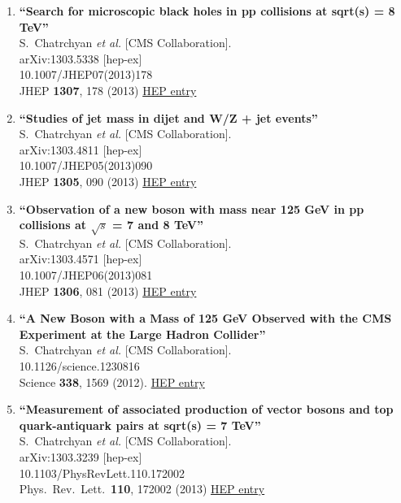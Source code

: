\documentclass{article}
\begin{document}
\begin{enumerate}
\item%
{\bf ``Search for microscopic black holes in pp collisions at sqrt(s) = 8 TeV''}
  \\{}S.~Chatrchyan {\it et al.} [CMS Collaboration].
  \\{}arXiv:1303.5338 [hep-ex]
    \\{}10.1007/JHEP07(2013)178
\\{}JHEP {\bf 1307}, 178 (2013) %
\href{http://inspirehep.net/record/1224805}{HEP entry}


\item%
{\bf ``Studies of jet mass in dijet and W/Z + jet events''}
  \\{}S.~Chatrchyan {\it et al.} [CMS Collaboration].
  \\{}arXiv:1303.4811 [hep-ex]
    \\{}10.1007/JHEP05(2013)090
\\{}JHEP {\bf 1305}, 090 (2013) %
\href{http://inspirehep.net/record/1224539}{HEP entry}


\item%
{\bf ``Observation of a new boson with mass near 125 GeV in pp collisions at $\sqrt{s}$ = 7 and 8 TeV''}
  \\{}S.~Chatrchyan {\it et al.} [CMS Collaboration].
  \\{}arXiv:1303.4571 [hep-ex]
    \\{}10.1007/JHEP06(2013)081
\\{}JHEP {\bf 1306}, 081 (2013) %
\href{http://inspirehep.net/record/1224273}{HEP entry}


\item%
{\bf ``A New Boson with a Mass of 125 GeV Observed with the CMS Experiment at the Large Hadron Collider''}
  \\{}S.~Chatrchyan {\it et al.} [CMS Collaboration].
    \\{}10.1126/science.1230816
\\{}Science {\bf 338}, 1569 (2012). %
\href{http://inspirehep.net/record/1223729}{HEP entry}


\item%
{\bf ``Measurement of associated production of vector bosons and top quark-antiquark pairs at sqrt(s) = 7 TeV''}
  \\{}S.~Chatrchyan {\it et al.} [CMS Collaboration].
  \\{}arXiv:1303.3239 [hep-ex]
    \\{}10.1103/PhysRevLett.110.172002
\\{}Phys.\ Rev.\ Lett.\  {\bf 110}, 172002 (2013) %
\href{http://inspirehep.net/record/1223628}{HEP entry}



\end{enumerate}
\end{document}
